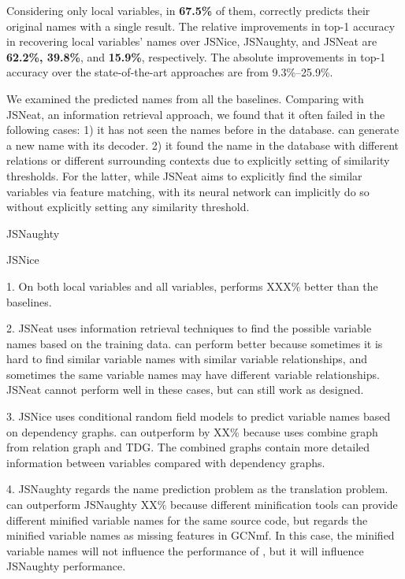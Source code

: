 Considering only local variables, in {\bf 67.5\%} of them, {\tool}
correctly predicts their original names with a single result. The
relative improvements in top-1 accuracy in recovering local variables'
names over JSNice, JSNaughty, and JSNeat are {\bf 62.2\%, 39.8\%}, and
{\bf 15.9\%}, respectively. The absolute improvements in top-1
accuracy over the state-of-the-art approaches are from 9.3\%--25.9\%.

We examined the predicted names from all the baselines. Comparing with
JSNeat, an information retrieval approach, we found that it often
failed in the following cases: 1) it has not seen the names before in
the database. {\tool} can generate a new name with its decoder. 2) it
found the name in the database with different relations or different
surrounding contexts due to explicitly setting of similarity
thresholds. For the latter, while JSNeat aims to explicitly find the
similar variables via feature matching, {\tool} with its neural
network can implicitly do so without explicitly setting any similarity
threshold.

JSNaughty

JSNice


1. On both local variables and all variables, {\tool} performs XXX\%
better than the baselines.

2. JSNeat uses information retrieval techniques to find the possible
variable names based on the training data. {\tool} can perform better
because sometimes it is hard to find similar variable names with
similar variable relationships, and sometimes the same variable names
may have different variable relationships. JSNeat cannot perform well
in these cases, but {\tool} can still work as designed.

3. JSNice uses conditional random field models to predict variable
names based on dependency graphs. {\tool} can outperform {\tool} by
XX\% because {\tool} uses combine graph from relation graph and
TDG. The combined graphs contain more detailed information between
variables compared with dependency graphs.

4. JSNaughty regards the name prediction problem as the translation
problem. {\tool} can outperform JSNaughty XX\% because different
minification tools can provide different minified variable names for
the same source code, but {\tool} regards the minified variable names
as missing features in GCNmf. In this case, the minified variable
names will not influence the performance of {\tool}, but it will
influence JSNaughty performance.
